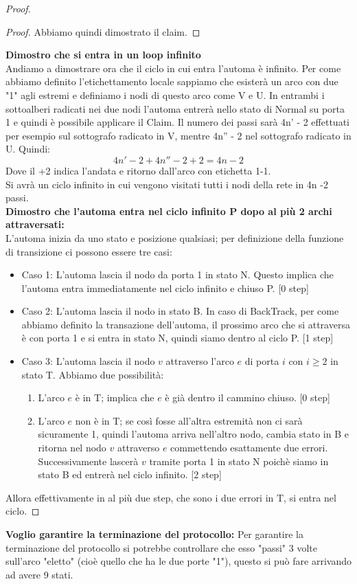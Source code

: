 \begin{proof}
\begin{proof}
Abbiamo quindi dimostrato il claim.
\end{proof}
\textbf{Dimostro che si entra in un loop infinito}\\
Andiamo a dimostrare ora che il ciclo in cui entra l'automa è infinito.
Per come abbiamo definito l'etichettamento locale sappiamo che esisterà un arco con due "1" agli estremi e definiamo i nodi di questo arco come V e U. In entrambi i sottoalberi radicati nei due nodi l'automa entrerà nello stato di Normal su porta 1 e quindi è possibile applicare il Claim. Il numero dei passi sarà 4n' - 2 effettuati per esempio sul sottografo radicato in V, mentre 4n'' - 2 nel sottografo radicato in U. Quindi: \\
$$4n'-2 + 4n''-2 + 2 = 4n -2$$
Dove il +2 indica l'andata e ritorno dall'arco con etichetta 1-1.\\
Si avrà un ciclo infinito in cui vengono visitati tutti i nodi della rete in 4n -2 passi.\\
\textbf{Dimostro che l'automa entra nel ciclo infinito P dopo al più 2 archi attraversati:}\\
L'automa inizia da uno stato e posizione qualsiasi; per definizione della funzione di transizione ci possono essere tre casi:
\begin{itemize}
    \item Caso 1: L'automa lascia il nodo da porta 1 in stato N. Questo implica che l'automa entra immediatamente nel ciclo infinito e chiuso P. [0 step]
    \item Caso 2: L'automa lascia il nodo in stato B. In caso di BackTrack, per come abbiamo definito la transazione dell'automa, il prossimo arco che si attraversa è con porta 1 e si entra in stato N, quindi siamo dentro al ciclo P. [1 step]
    \item Caso 3: L'automa lascia il nodo $v$ attraverso l'arco $e$ di porta $i$ con $i\geq2$ in stato T. Abbiamo due possibilità:
        \begin{enumerate}
            \item L'arco $e$ è in T; implica che $e$ è già dentro il cammino chiuso. [0 step]
            \item L'arco $e$ non è in T; se così fosse all'altra estremità non ci sarà sicuramente 1, quindi l'automa arriva nell'altro nodo, cambia stato in B e ritorna nel nodo $v$ attraverso $e$ commettendo esattamente due errori. Successivamente lascerà $v$ tramite porta 1 in stato N poichè siamo in stato B ed entrerà nel ciclo infinito. [2 step]
        \end{enumerate}
\end{itemize}
Allora effettivamente in al più due step, che sono i due errori in T, si entra nel ciclo.
\end{proof}
\textbf{Voglio garantire la terminazione del protocollo: }
Per garantire la terminazione del protocollo si potrebbe controllare che esso "passi" 3 volte sull'arco "eletto" (cioè quello che ha le due porte "1"), questo si può fare arrivando ad avere 9 stati.

